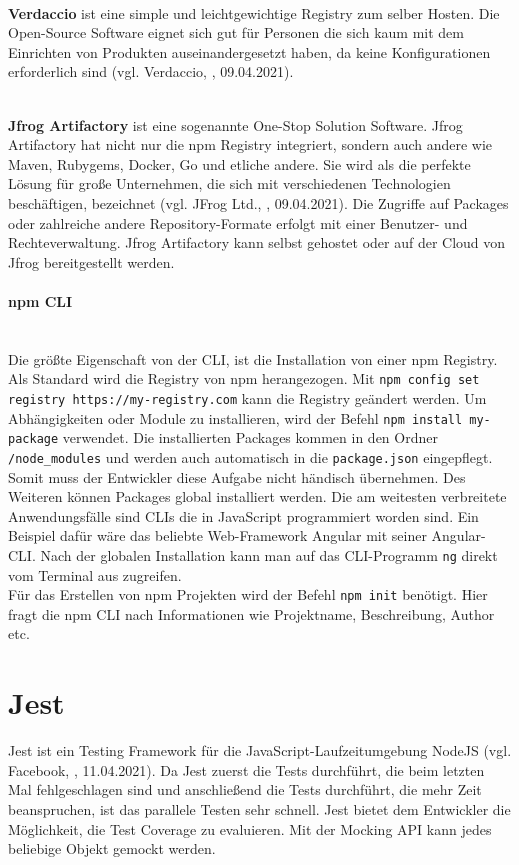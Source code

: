 \mbox{}\\
\textbf{Verdaccio} ist eine simple und leichtgewichtige Registry zum selber Hosten. Die Open-Source Software eignet sich gut für Personen die sich kaum mit dem Einrichten von Produkten auseinandergesetzt haben, da keine Konfigurationen erforderlich sind (vgl. Verdaccio, \cite{verdaccio_2021}, 09.04.2021).

\mbox{}\\
\textbf{Jfrog Artifactory} ist eine sogenannte One-Stop Solution Software. Jfrog Artifactory hat nicht nur die npm Registry integriert, sondern auch andere wie Maven, Rubygems, Docker, Go und etliche andere. Sie wird als die perfekte Lösung für große Unternehmen, die sich mit verschiedenen Technologien beschäftigen, bezeichnet (vgl. JFrog Ltd., \cite{jfrog_2021}, 09.04.2021). Die Zugriffe auf Packages oder zahlreiche andere Repository-Formate erfolgt mit einer Benutzer- und Rechteverwaltung. Jfrog Artifactory kann selbst gehostet oder auf der Cloud von Jfrog bereitgestellt werden.

\paragraph{npm CLI}
\mbox{}\\
Die größte Eigenschaft von der CLI, ist die Installation von einer npm Registry. Als Standard wird die Registry von npm herangezogen. Mit \texttt{npm config set registry https://my-registry.com} kann die Registry geändert werden. Um Abhängigkeiten oder Module zu installieren, wird der Befehl \texttt{npm install my-package} verwendet. Die installierten Packages kommen in den Ordner \texttt{/node\_modules} und werden auch automatisch in die \texttt{package.json} eingepflegt. Somit muss der Entwickler diese Aufgabe nicht händisch übernehmen. Des Weiteren können Packages global installiert werden. Die am weitesten verbreitete Anwendungsfälle sind CLIs die in JavaScript programmiert worden sind. Ein Beispiel dafür wäre das beliebte Web-Framework Angular mit seiner Angular-CLI. Nach der globalen Installation kann man auf das CLI-Programm \texttt{ng} direkt vom Terminal aus zugreifen.\\
Für das Erstellen von npm Projekten wird der Befehl \texttt{npm init} benötigt. Hier fragt die npm CLI nach Informationen wie Projektname, Beschreibung, Author etc.

\section{Jest}
Jest ist ein Testing Framework für die JavaScript-Laufzeitumgebung NodeJS (vgl. Facebook, \cite{jest_2021}, 11.04.2021). Da Jest zuerst die Tests durchführt, die beim letzten Mal fehlgeschlagen sind und anschließend die Tests durchführt, die mehr Zeit beanspruchen, ist das parallele Testen sehr schnell. Jest bietet dem Entwickler die Möglichkeit, die Test Coverage zu evaluieren. Mit der Mocking API kann jedes beliebige Objekt gemockt werden.

